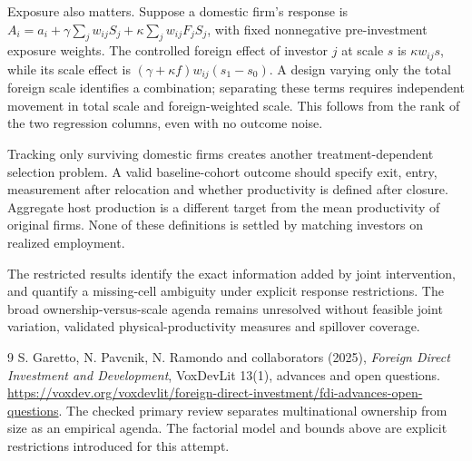 \documentclass[11pt,a4paper]{article}
\begin{document}
Exposure also matters. Suppose a domestic firm's response is $A_i=a_i+\gamma\sum_jw_{ij}S_j+\kappa\sum_jw_{ij}F_jS_j$, with fixed nonnegative pre-investment exposure weights. The controlled foreign effect of investor $j$ at scale $s$ is $\kappa w_{ij}s$, while its scale effect is $(\gamma+\kappa f)w_{ij}(s_1-s_0)$. A design varying only the total foreign scale identifies a combination; separating these terms requires independent movement in total scale and foreign-weighted scale. This follows from the rank of the two regression columns, even with no outcome noise.

Tracking only surviving domestic firms creates another treatment-dependent selection problem. A valid baseline-cohort outcome should specify exit, entry, measurement after relocation and whether productivity is defined after closure. Aggregate host production is a different target from the mean productivity of original firms. None of these definitions is settled by matching investors on realized employment.

The restricted results identify the exact information added by joint intervention, and quantify a missing-cell ambiguity under explicit response restrictions. The broad ownership-versus-scale agenda remains unresolved without feasible joint variation, validated physical-productivity measures and spillover coverage.

\begin{thebibliography}{9}
 S. Garetto, N. Pavcnik, N. Ramondo and collaborators (2025), \emph{Foreign Direct Investment and Development}, VoxDevLit 13(1), advances and open questions. \url{https://voxdev.org/voxdevlit/foreign-direct-investment/fdi-advances-open-questions}. The checked primary review separates multinational ownership from size as an empirical agenda. The factorial model and bounds above are explicit restrictions introduced for this attempt.
\end{thebibliography}
\end{document}
